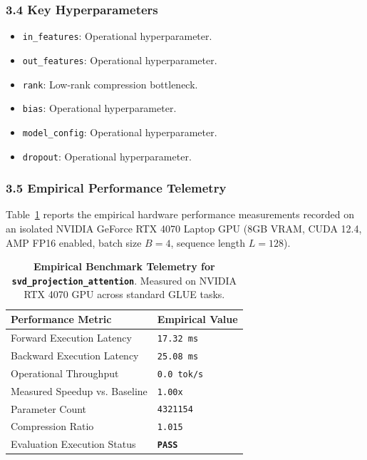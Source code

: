 \subsubsection*{3.4 Key Hyperparameters}
\begin{itemize}
    \item \texttt{in\_features}: Operational hyperparameter.
    \item \texttt{out\_features}: Operational hyperparameter.
    \item \texttt{rank}: Low-rank compression bottleneck.
    \item \texttt{bias}: Operational hyperparameter.
    \item \texttt{model\_config}: Operational hyperparameter.
    \item \texttt{dropout}: Operational hyperparameter.
\end{itemize}

\subsubsection*{3.5 Empirical Performance Telemetry}
Table~\ref{tab:telemetry_svd\_projection\_attention} reports the empirical hardware performance measurements recorded on an isolated NVIDIA GeForce RTX 4070 Laptop GPU (8GB VRAM, CUDA 12.4, AMP FP16 enabled, batch size $B=4$, sequence length $L=128$).

\begin{table}[h]
\centering
\small
\caption{\textbf{Empirical Benchmark Telemetry for \texttt{svd\_projection\_attention}}. Measured on NVIDIA RTX 4070 GPU across standard GLUE tasks.}
\label{tab:telemetry_svd\_projection\_attention}
\begin{tabularx}{\columnwidth}{lX}
\toprule
\textbf{Performance Metric} & \textbf{Empirical Value} \\
\midrule
Forward Execution Latency & \texttt{17.32 ms} \\
Backward Execution Latency & \texttt{25.08 ms} \\
Operational Throughput & \texttt{0.0 tok/s} \\
Measured Speedup vs. Baseline & \texttt{1.00x} \\
Parameter Count & \texttt{4321154} \\
Compression Ratio & \texttt{1.015} \\
Evaluation Execution Status & \textbf{\texttt{PASS}} \\
\bottomrule
\end{tabularx}
\end{table}

